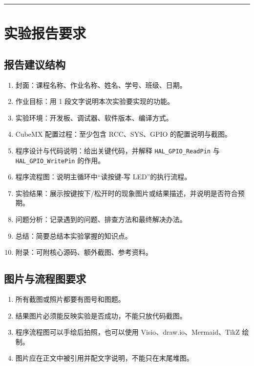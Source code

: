\documentclass[
  chinese,
  UTF8,
  oneside,
  openany]{ctexbook}
\providecommand{\tightlist}{%
  \setlength{\itemsep}{0pt}\setlength{\parskip}{0pt}}
\begin{document}
\begin{center}\rule{0.5\linewidth}{0.5pt}\end{center}

\section{实验报告要求}\label{ux5b9eux9a8cux62a5ux544aux8981ux6c42}

\subsection{报告建议结构}\label{ux62a5ux544aux5efaux8baeux7ed3ux6784}

\begin{enumerate}
\def\labelenumi{\arabic{enumi}.}
\tightlist
\item
  封面：课程名称、作业名称、姓名、学号、班级、日期。
\item
  作业目标：用 1 段文字说明本次实验要实现的功能。
\item
  实验环境：开发板、调试器、软件版本、编译方式。
\item
  CubeMX 配置过程：至少包含 RCC、SYS、GPIO 的配置说明与截图。
\item
  程序设计与代码说明：给出关键代码，并解释 \texttt{HAL\_GPIO\_ReadPin}
  与 \texttt{HAL\_GPIO\_WritePin} 的作用。
\item
  程序流程图：说明主循环中``读按键-写 LED''的执行流程。
\item
  实验结果：展示按键按下/松开时的现象图片或结果描述，并说明是否符合预期。
\item
  问题分析：记录遇到的问题、排查方法和最终解决办法。
\item
  总结：简要总结本实验掌握的知识点。
\item
  附录：可附核心源码、额外截图、参考资料。
\end{enumerate}

\subsection{图片与流程图要求}\label{ux56feux7247ux4e0eux6d41ux7a0bux56feux8981ux6c42}

\begin{enumerate}
\def\labelenumi{\arabic{enumi}.}
\tightlist
\item
  所有截图或照片都要有图号和图题。
\item
  结果图片必须能反映实验是否成功，不能只放代码截图。
\item
  程序流程图可以手绘后拍照，也可以使用 Visio、draw.io、Mermaid、TikZ
  绘制。
\item
  图片应在正文中被引用并配文字说明，不能只在末尾堆图。
\end{enumerate}
\end{document}

